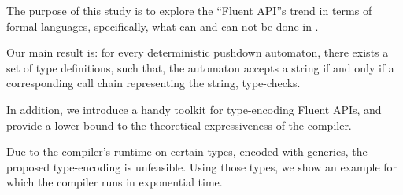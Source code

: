 The purpose of this study is to explore the ``Fluent API''s trend in
  terms of formal languages, specifically, what can and can not be done 
  in \Java.

Our main result is: for every deterministic pushdown automaton,
  there exists a set of \Java type definitions, such that,
  the automaton accepts a string if and only if a corresponding 
  call chain representing the string, type-checks.

In addition, we introduce a handy toolkit for type-encoding Fluent APIs,
and provide a lower-bound to the theoretical expressiveness of the \Java compiler.
  
Due to the compiler's runtime on certain types, encoded with \Java generics,
  the proposed type-encoding is unfeasible.
Using those types, we show an example for which the compiler runs in exponential time.